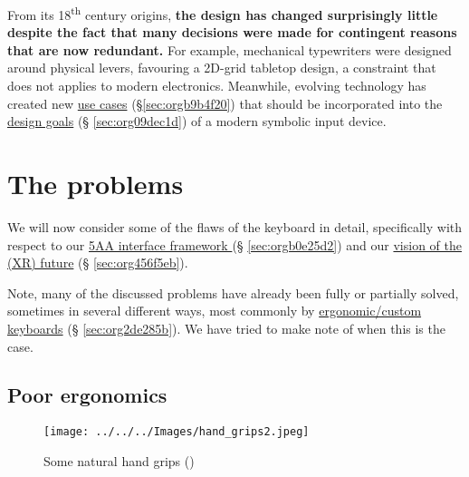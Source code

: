 \documentclass[logo,bsc,singlespacing,parskip]{infthesis}
\begin{document}
From its 18\textsuperscript{th} century origins, \textbf{the design has changed surprisingly little despite the fact that many decisions were made for contingent reasons that are now redundant.}
For example, mechanical typewriters were designed around physical levers, favouring a 2D-grid tabletop design, a constraint that does not applies to modern electronics.
Meanwhile, evolving technology has created new \hyperref[sec:orgb9b4f20]{use cases} (\S \ref{sec:orgb9b4f20}) that should be incorporated into the \hyperref[sec:org09dec1d]{design goals} (§ \ref{sec:org09dec1d}) of a modern symbolic input device.
\section{The problems}
\label{sec:org5a3dba0}
We will now consider some of the flaws of the keyboard in detail, specifically with respect to our  \hyperref[sec:orgb0e25d2]{5AA interface framework } (§ \ref{sec:orgb0e25d2}) and our \hyperref[sec:org456f5eb]{vision of the (XR) future} (§ \ref{sec:org456f5eb}).

Note, many of the discussed problems have already been fully or partially solved, sometimes in several different ways, most commonly by \hyperref[sec:org2de285b]{ergonomic/custom keyboards} (§ \ref{sec:org2de285b}).
We have tried to make note of when this is the case.
\subsection{Poor ergonomics}
\label{sec:orgf05ac75}
\begin{figure}[h]
\centering
\texttt{[image: ../../../Images/hand\_grips2.jpeg]}
\caption{\label{fig:hand_grips}Some natural hand grips (\autocite{victorBriefRantFuture})}
\end{figure}
\end{document}
